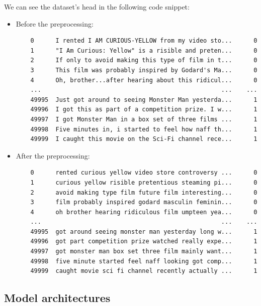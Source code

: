 \documentclass{article}
\begin{document}
We can see the dataset's head in the following code snippet:
\begin{itemize}
  \item Before the preprocessing:
    \begin{lstlisting}
    0      I rented I AM CURIOUS-YELLOW from my video sto...      0
    1      "I Am Curious: Yellow" is a risible and preten...      0
    2      If only to avoid making this type of film in t...      0
    3      This film was probably inspired by Godard's Ma...      0
    4      Oh, brother...after hearing about this ridicul...      0
    ...                                                  ...    ...
    49995  Just got around to seeing Monster Man yesterda...      1
    49996  I got this as part of a competition prize. I w...      1
    49997  I got Monster Man in a box set of three films ...      1
    49998  Five minutes in, i started to feel how naff th...      1
    49999  I caught this movie on the Sci-Fi channel rece...      1
    \end{lstlisting}

  \item After the preprocessing:
    \begin{lstlisting}
    0      rented curious yellow video store controversy ...      0
    1      curious yellow risible pretentious steaming pi...      0
    2      avoid making type film future film interesting...      0
    3      film probably inspired godard masculin feminin...      0
    4      oh brother hearing ridiculous film umpteen yea...      0
    ...                                                  ...    ...
    49995  got around seeing monster man yesterday long w...      1
    49996  got part competition prize watched really expe...      1
    49997  got monster man box set three film mainly want...      1
    49998  five minute started feel naff looking got comp...      1
    49999  caught movie sci fi channel recently actually ...      1
    \end{lstlisting}
\end{itemize}

\subsection{Model architectures}
\end{document}
